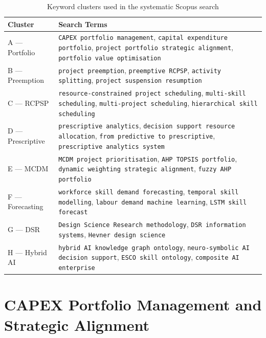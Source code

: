 \begin{table}[htbp]
  \centering
  \caption{Keyword clusters used in the systematic Scopus search}
  \label{tab:keywords}
  \small
  \begin{tabular}{@{}lp{10.5cm}@{}}
    \toprule
    \textbf{Cluster} & \textbf{Search Terms} \\
    \midrule
    A — Portfolio & \texttt{CAPEX portfolio management}, \texttt{capital expenditure
      portfolio}, \texttt{project portfolio strategic alignment},
      \texttt{portfolio value optimisation} \\[0.3em]
    B — Preemption & \texttt{project preemption}, \texttt{preemptive RCPSP},
      \texttt{activity splitting}, \texttt{project suspension resumption} \\[0.3em]
    C — RCPSP & \texttt{resource-constrained project scheduling},
      \texttt{multi-skill scheduling}, \texttt{multi-project scheduling},
      \texttt{hierarchical skill scheduling} \\[0.3em]
    D — Prescriptive & \texttt{prescriptive analytics}, \texttt{decision support
      resource allocation}, \texttt{from predictive to prescriptive},
      \texttt{prescriptive analytics system} \\[0.3em]
    E — MCDM & \texttt{MCDM project prioritisation}, \texttt{AHP TOPSIS portfolio},
      \texttt{dynamic weighting strategic alignment}, \texttt{fuzzy AHP portfolio} \\[0.3em]
    F — Forecasting & \texttt{workforce skill demand forecasting},
      \texttt{temporal skill modelling}, \texttt{labour demand machine learning},
      \texttt{LSTM skill forecast} \\[0.3em]
    G — DSR & \texttt{Design Science Research methodology},
      \texttt{DSR information systems}, \texttt{Hevner design science} \\[0.3em]
    H — Hybrid AI & \texttt{hybrid AI knowledge graph ontology},
      \texttt{neuro-symbolic AI decision support}, \texttt{ESCO skill ontology},
      \texttt{composite AI enterprise} \\
    \bottomrule
  \end{tabular}
\end{table}

\section{CAPEX Portfolio Management and Strategic Alignment}
\label{sec:lit_capex}

